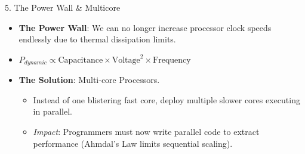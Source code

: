 \documentclass[aspectratio=169]{beamer}
\begin{document}
\begin{frame}{5. The Power Wall \& Multicore}
\begin{itemize}
    \item \textbf{The Power Wall}: We can no longer increase processor clock speeds endlessly due to thermal dissipation limits.
    \item $P_{dynamic} \propto \text{Capacitance} \times \text{Voltage}^2 \times \text{Frequency}$
    \item \textbf{The Solution}: Multi-core Processors.
    \begin{itemize}
        \item Instead of one blistering fast core, deploy multiple slower cores executing in parallel.
        \item \textit{Impact}: Programmers must now write parallel code to extract performance (Ahmdal's Law limits sequential scaling).
    \end{itemize}
\end{itemize}
\end{frame}
\end{document}
